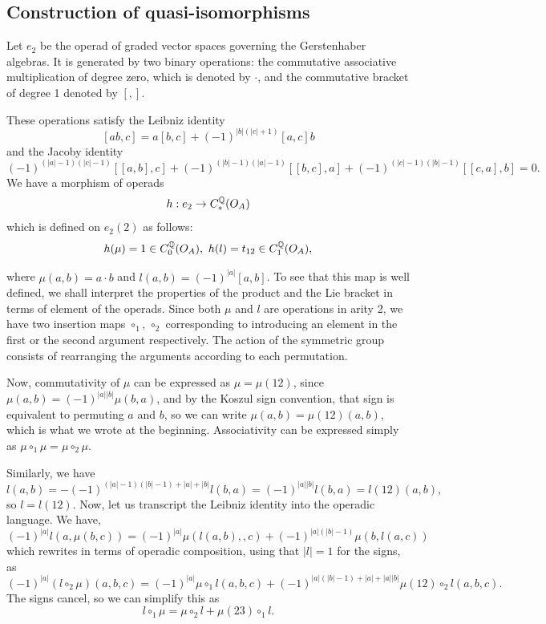 \documentclass[TFM.tex]{subfiles}
\begin{document}
\subsection{Construction of quasi-isomorphisms}
Let $e_2$ be the operad of graded vector spaces governing the Gerstenhaber algebras.
It is generated by two binary operations: the commutative associative multiplication of degree zero, which is denoted by $\cdot$, and the commutative bracket of degree 1 denoted by $[,]$. 

These operations satisfy the Leibniz identity
\[
[ab, c]= a[b, c]+(-1)^{|b|(|c|+1)}[a,c]b
\]
and the Jacoby identity
\[
(-1)^{(|a|-1)(|c|-1)}[[a,b],c]+(-1)^{(|b|-1)(|a|-1)}[[b,c],a]+(-1)^{(|c|-1)(|b|-1)}[[c,a],b]=0.
\]
We have a morphism of operads
\[
h:e_2\to C_*^{\mathbb{Q}}(O_A)
\]
which is defined on $e_2(2)$ as follows:
\[
h(\mu)=1\in C_0^\Q(O_A),\ h(l)=t_{12}\in C_1^\Q(O_A),
\]

where $\mu(a,b)=a\cdot b$ and $l(a,b)=(-1)^{|a|}[a,b]$. To see that this map is well defined, we shall interpret the properties of the product and the Lie bracket in terms of element of the operads. Since both $\mu$ and $l$ are operations in arity 2, we have two insertion maps $\circ_1$, $\circ_2$ corresponding to introducing an element in the first or the second argument respectively. The action of the symmetric group consists of rearranging the arguments according to each permutation.

Now, commutativity of $\mu$ can be expressed as $\mu=\mu(12)$, since $\mu(a,b)=(-1)^{|a||b|}\mu(b,a)$, and by the Koszul sign convention, that sign is equivalent to permuting $a$ and $b$, so we can write $\mu(a,b)=\mu(12)(a,b)$, which is what we wrote at the beginning.  Associativity can be expressed simply as $\mu\circ_1\mu=\mu\circ_2\mu$.

Similarly, we have 
\[
l(a,b)=-(-1)^{(|a|-1)(|b|-1)+|a|+|b|}l(b,a)=(-1)^{|a||b|}l(b,a)=l(12)(a,b),
\]
so $l=l(12)$. Now, let us transcript the Leibniz identity into the operadic language. We have, 
\[
(-1)^{|a|}l(a,\mu(b,c))=(-1)^{|a|}\mu(l(a,b),,c)+(-1)^{|a|(|b|-1)}\mu(b,l(a,c))
\]
which rewrites in terms of operadic composition, using that $|l|=1$ for the signs, as %
\[
(-1)^{|a|}(l\circ_2\mu)(a,b,c)=(-1)^{|a|}\mu\circ_1 l(a,b,c)+(-1)^{|a|(|b|-1)+|a|+|a||b|}\mu(12)\circ_2 l(a,b,c).
\]
The signs cancel, so we can simplify this as
\[
l\circ_1\mu =\mu\circ_2 l +\mu(23)\circ_1 l.
\]
\end{document}
